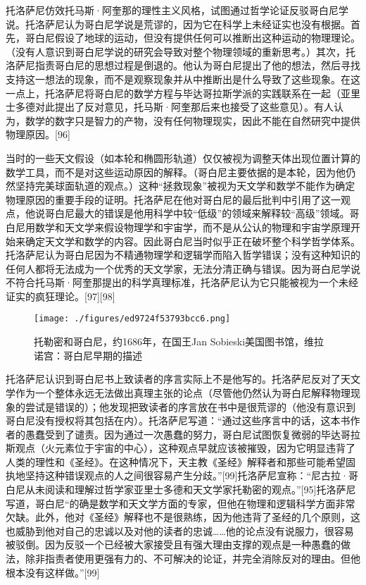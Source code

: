 托洛萨尼仿效托马斯·阿奎那的理性主义风格，试图通过哲学论证反驳哥白尼学说。托洛萨尼认为哥白尼学说是荒谬的，因为它在科学上未经证实也没有根据。首先，哥白尼假设了地球的运动，但没有提供任何可以推断出这种运动的物理理论。（没有人意识到哥白尼学说的研究会导致对整个物理领域的重新思考。）其次，托洛萨尼指责哥白尼的思想过程是倒退的。他认为哥白尼提出了他的想法，然后寻找支持这一想法的现象，而不是观察现象并从中推断出是什么导致了这些现象。在这一点上，托洛萨尼将哥白尼的数学方程与毕达哥拉斯学派的实践联系在一起（亚里士多德对此提出了反对意见，托马斯·阿奎那后来也接受了这些意见）。有人认为，数学的数字只是智力的产物，没有任何物理现实，因此不能在自然研究中提供物理原因。[96]

当时的一些天文假设（如本轮和椭圆形轨道）仅仅被视为调整天体出现位置计算的数学工具，而不是对这些运动原因的解释。（哥白尼主要依据的是本轮，因为他仍然坚持完美球面轨道的观点。）这种“拯救现象”被视为天文学和数学不能作为确定物理原因的重要手段的证明。托洛萨尼在他对哥白尼的最后批判中引用了这一观点，他说哥白尼最大的错误是他用科学中较“低级”的领域来解释较“高级”领域。哥白尼用数学和天文学来假设物理学和宇宙学，而不是从公认的物理和宇宙学原理开始来确定天文学和数学的内容。因此哥白尼当时似乎正在破坏整个科学哲学体系。托洛萨尼认为哥白尼因为不精通物理学和逻辑学而陷入哲学错误；没有这种知识的任何人都将无法成为一个优秀的天文学家，无法分清正确与错误。因为哥白尼学说不符合托马斯·阿奎那提出的科学真理标准，托洛萨尼认为它只能被视为一个未经证实的疯狂理论。[97][98]
\begin{figure}[ht]
\centering
\texttt{[image: ./figures/ed9724f53793bcc6.png]}
\caption{托勒密和哥白尼，约1686年，在国王Jan Sobieski美国图书馆，维拉诺宫：哥白尼早期的描述} \label{fig_GBN_25}
\end{figure}
托洛萨尼认识到哥白尼书上致读者的序言实际上不是他写的。托洛萨尼反对了天文学作为一个整体永远无法做出真理主张的论点（尽管他仍然认为哥白尼解释物理现象的尝试是错误的）；他发现把致读者的序言放在书中是很荒谬的（他没有意识到哥白尼没有授权将其包括在内）。托洛萨尼写道：“通过这些序言中的话，这本书作者的愚蠢受到了谴责。因为通过一次愚蠢的努力，哥白尼试图恢复微弱的毕达哥拉斯观点（火元素位于宇宙的中心），这种观点早就应该被摧毁，因为它明显违背了人类的理性和《圣经》。在这种情况下，天主教《圣经》解释者和那些可能希望固执地坚持这种错误观点的人之间很容易产生分歧。”[99]托洛萨尼宣称：“尼古拉·哥白尼从未阅读和理解过哲学家亚里士多德和天文学家托勒密的观点。”[95]托洛萨尼写道，哥白尼“的确是数学和天文学方面的专家，但他在物理和逻辑科学方面非常欠缺。此外，他对《圣经》解释也不是很熟练，因为他违背了圣经的几个原则，这也威胁到他对自己的忠诚以及对他的读者的忠诚……他的论点没有说服力，很容易被驳倒。因为反驳一个已经被大家接受且有强大理由支撑的观点是一种愚蠢的做法，除非指责者使用更强有力的、不可解决的论证，并完全消除反对的理由。但他根本没有这样做。”[99]

